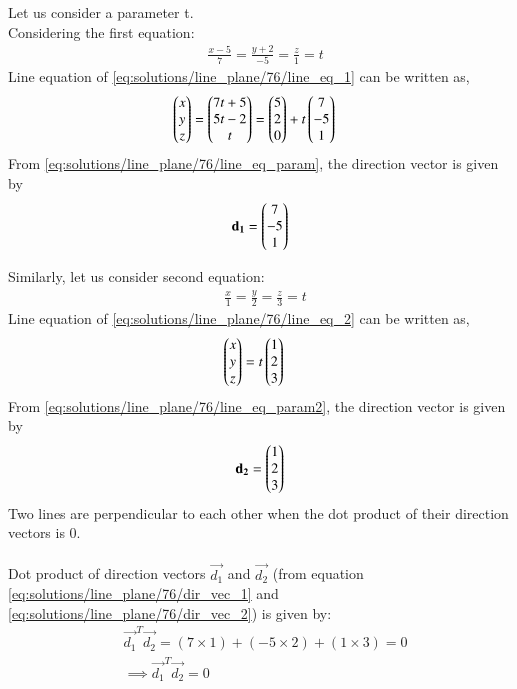Let us consider a parameter t.\\ Considering the first equation:
 \begin{align}  \label{eq:solutions/line_plane/76/line_eq_1}
& \frac{x-5}{7} = \frac{y+2}{-5} = \frac{z}{1} = t
\end{align}
Line equation of \eqref{eq:solutions/line_plane/76/line_eq_1} can be written as,
 \begin{align} \label{eq:solutions/line_plane/76/line_eq_param}
& \begin{pmatrix}x\\ y\\ z\end{pmatrix} = \begin{pmatrix}7t+5\\ 5t-2\\ t\end{pmatrix} = \begin{pmatrix}5\\ 2\\ 0\end{pmatrix} +t \begin{pmatrix}7\\ -5\\ 1\end{pmatrix}
\end{align}
From \eqref{eq:solutions/line_plane/76/line_eq_param}, the direction vector is given by 
 \begin{align} \label{eq:solutions/line_plane/76/dir_vec_1}
\mathbf{d_1} = \begin{pmatrix}7\\ -5\\ 1\end{pmatrix}
 \end{align}

Similarly, let us consider second equation:
 \begin{align} \label{eq:solutions/line_plane/76/line_eq_2}
& \frac{x}{1} = \frac{y}{2} = \frac{z}{3} = t
\end{align}
Line equation of  \eqref{eq:solutions/line_plane/76/line_eq_2} can be written as,
 \begin{align} \label{eq:solutions/line_plane/76/line_eq_param2}
& \begin{pmatrix}x\\ y\\ z\end{pmatrix} = t \begin{pmatrix}1\\ 2\\ 3\end{pmatrix}
\end{align}
From  \eqref{eq:solutions/line_plane/76/line_eq_param2},  the direction vector is given by 
 \begin{align} \label{eq:solutions/line_plane/76/dir_vec_2}
\mathbf{d_2} = \begin{pmatrix}1\\ 2\\ 3\end{pmatrix}
 \end{align}
Two lines are perpendicular to each other when the dot product of their direction vectors is 0.\\
\\
Dot product of direction vectors $\vec{d_1}$ and $\vec{d_2}$ (from equation \eqref{eq:solutions/line_plane/76/dir_vec_1} and \eqref{eq:solutions/line_plane/76/dir_vec_2}) is given by:
 \begin{align}
& \vec{d_1}^T\vec{d_2}= (7 \times 1) + (-5 \times 2) + (1 \times 3) = 0   \label{eq:solutions/line_plane/76/dotproduct}\\
& \implies \boxed{\vec{d_1}^T\vec{d_2} = 0}  \label{eq:solutions/line_plane/76/res}
\end{align}



